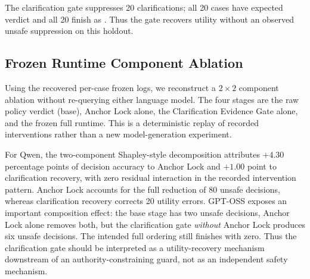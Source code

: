 The clarification gate suppresses 20 clarifications; all 20 cases have expected verdict \allow and all 20 finish as \allow. Thus the gate recovers utility without an observed unsafe suppression on this holdout.

\subsection{Frozen Runtime Component Ablation}
Using the recovered per-case frozen logs, we reconstruct a $2\times2$ component ablation without re-querying either language model. The four stages are the raw policy verdict (base), Anchor Lock alone, the Clarification Evidence Gate alone, and the frozen full runtime. This is a deterministic replay of recorded interventions rather than a new model-generation experiment.

\begin{table}[t]
\centering
\caption{Component ablation reconstructed from the frozen 2,000-case per-model logs. Unsafe \allow counts cases predicted \allow when the expected verdict is not \allow.}
\label{tab:ablation}
\end{table}

For Qwen, the two-component Shapley-style decomposition attributes $+4.30$ percentage points of decision accuracy to Anchor Lock and $+1.00$ point to clarification recovery, with zero residual interaction in the recorded intervention pattern. Anchor Lock accounts for the full reduction of 80 unsafe \allow decisions, whereas clarification recovery corrects 20 utility errors. GPT-OSS exposes an important composition effect: the base stage has two unsafe \allow decisions, Anchor Lock alone removes both, but the clarification gate \emph{without} Anchor Lock produces six unsafe \allow decisions. The intended full ordering still finishes with zero. Thus the clarification gate should be interpreted as a utility-recovery mechanism downstream of an authority-constraining guard, not as an independent safety mechanism.




